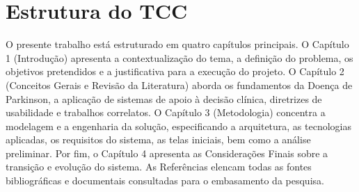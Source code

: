 \section{Estrutura do TCC}
\label{sec:Estrutura do TCC}

O presente trabalho está estruturado em quatro capítulos principais. O Capítulo 1 (Introdução) apresenta a contextualização do tema, a definição do problema, os objetivos pretendidos e a justificativa para a execução do projeto. O Capítulo 2 (Conceitos Gerais e Revisão da Literatura) aborda os fundamentos da Doença de Parkinson, a aplicação de sistemas de apoio à decisão clínica, diretrizes de usabilidade e trabalhos correlatos. O Capítulo 3 (Metodologia) concentra a modelagem e a engenharia da solução, especificando a arquitetura, as tecnologias aplicadas, os requisitos do sistema, as telas iniciais, bem como a análise preliminar. Por fim, o Capítulo 4 apresenta as Considerações Finais sobre a transição e evolução do sistema. As Referências elencam todas as fontes bibliográficas e documentais consultadas para o embasamento da pesquisa.
